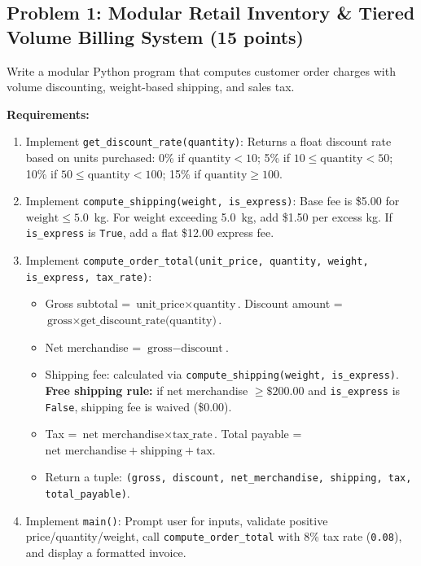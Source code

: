 \documentclass[11pt,a4paper]{article}
\begin{document}
\subsection*{Problem 1: Modular Retail Inventory \& Tiered Volume Billing System (15 points)}
Write a modular Python program that computes customer order charges with volume discounting, weight-based shipping, and sales tax.

\textbf{Requirements:}
\begin{enumerate}[leftmargin=2em,label=\arabic*.,itemsep=1pt]
  \item Implement \texttt{get\_discount\_rate(quantity)}: Returns a float discount rate based on units purchased:
    0\% if $\text{quantity} < 10$; 5\% if $10 \le \text{quantity} < 50$; 10\% if $50 \le \text{quantity} < 100$; 15\% if $\text{quantity} \ge 100$.
  \item Implement \texttt{compute\_shipping(weight, is\_express)}: Base fee is \$5.00 for $\text{weight} \le 5.0$~kg. For weight exceeding 5.0~kg, add \$1.50 per excess kg. If \texttt{is\_express} is \texttt{True}, add a flat \$12.00 express fee.
  \item Implement \texttt{compute\_order\_total(unit\_price, quantity, weight, is\_express, tax\_rate)}:
    \begin{itemize}[itemsep=0.5pt]
      \item Gross subtotal = $\text{unit\_price} \times \text{quantity}$. Discount amount = $\text{gross} \times \text{get\_discount\_rate(quantity)}$.
      \item Net merchandise = $\text{gross} - \text{discount}$.
      \item Shipping fee: calculated via \texttt{compute\_shipping(weight, is\_express)}. \textbf{Free shipping rule:} if net merchandise $\ge \$200.00$ and \texttt{is\_express} is \texttt{False}, shipping fee is waived (\$0.00).
      \item Tax = $\text{net merchandise} \times \text{tax\_rate}$. Total payable = $\text{net merchandise} + \text{shipping} + \text{tax}$.
      \item Return a tuple: \texttt{(gross, discount, net\_merchandise, shipping, tax, total\_payable)}.
    \end{itemize}
  \item Implement \texttt{main()}: Prompt user for inputs, validate positive price/quantity/weight, call \texttt{compute\_order\_total} with 8\% tax rate (\texttt{0.08}), and display a formatted invoice.
\end{enumerate}
\end{document}
